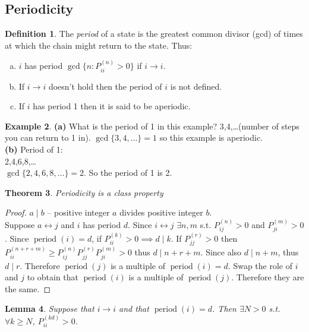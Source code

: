 \documentclass{article}
\newtheorem{thm}{Theorem}
\newtheorem{lem}[thm]{Lemma}
\theoremstyle{definition}
\newtheorem{defn}[thm]{Definition}
\newtheorem{ex}[thm]{Example}
\begin{document}
\subsection*{Periodicity}
\begin{defn}
The \emph{period} of a state is the greatest common divisor (gcd) of times at which the chain might return to the state. Thus:
\begin{enumerate}[(a)]
\item $i$ has period $\gcd\{n \colon P_{ii}^{(n)} > 0\}$ if $i \rightarrow i$.
\item If $i\rightarrow i$ doesn't hold then the period of $i$ is not defined.
\item If $i$ has period 1 then it is said to be aperiodic.
\end{enumerate}
\end{defn}

\begin{ex}
\textbf{(a)}
What is the period of 1 in this example? 3,4,\ldots (number of steps you can return to 1 in).
$\gcd\{3,4,\ldots\} = 1$ so this example is aperiodic.\\
\textbf{(b)}
Period of 1: \\
2,4,6,8,\ldots \\
$\gcd\{2,4,6,8,\ldots\} = 2$.
So the period of 1 is 2.
\end{ex}

\begin{thm} Periodicity is a class property \end{thm}
\begin{proof}
$a\mid b$ -- positive integer $a$ divides positive integer $b$. \\
Suppose $a\leftrightarrow j$ and $i$ has period $d$.
Since $i\leftrightarrow j$ $\exists n,m$ s.t. $P_{ij}^{(n)} > 0$ and $P_{ji}^{(m)}>0$.
Since $\operatorname{period}(i) = d$, if $P_{ii}^{(k)}>0 \implies d\mid k$.
If $P_{jj}^{(r)}> 0$ then $P_{ii}^{(n+r+m)} \ge P_{ij}^{(n)}P_{jj}^{(r)}P_{ji}^{(m)}>0$ thus $d\mid n+r+m$.
Since also $d\mid n+m$, thus $d\mid r$.
Therefore $\operatorname{period}(j)$ is a multiple of $\operatorname{period}(i) = d$.
Swap the role of $i$ and $j$ to obtain that $\operatorname{period}(i)$ is a multiple of $\operatorname{period}(j)$.
Therefore they are the same.
\end{proof}

\begin{lem}
Suppose that $i\rightarrow i$ and that $\operatorname{period}(i) = d$.
Then $\exists N>0$ s.t. $\forall k\ge N$, $P_{ii}^{(kd)} >0$.
\end{lem}
\end{document}
